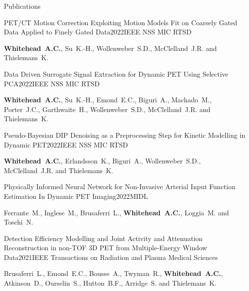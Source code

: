 \documentclass{cv}
\begin{document}
\begin{rSection}{Publications}
        \item \begin{rSubsection}{PET/CT Motion Correction Exploiting Motion Models Fit on Coarsely Gated Data Applied to Finely Gated Data}{2022}{IEEE NSS MIC RTSD}{}
            \item {\bf Whitehead~A.C.}, Su~K.-H., Wollenweber~S.D., McClelland~J.R. and Thielemans~K.
        \end{rSubsection}
        
        \item \begin{rSubsection}{Data Driven Surrogate Signal Extraction for Dynamic PET Using Selective PCA}{2022}{IEEE NSS MIC RTSD}{}
            \item {\bf Whitehead~A.C.}, Su~K.-H., Emond~E.C., Biguri~A., Machado~M., Porter~J.C., Garthwaite~H., Wollenweber~S.D., McClelland~J.R. and Thielemans~K.
        \end{rSubsection}
        
        \item \begin{rSubsection}{Pseudo-Bayesian DIP Denoising as a Preprocessing Step for Kinetic Modelling in Dynamic \newline PET}{2022}{IEEE NSS MIC RTSD}{}
            \item {\bf Whitehead~A.C.}, Erlandsson~K., Biguri~A., Wollenweber~S.D., McClelland~J.R. and Thielemans~K.
        \end{rSubsection}
        
        \item \begin{rSubsection}{Physically Informed Neural Network for Non-Invasive Arterial Input Function Estimation In Dynamic PET Imaging}{2022}{MIDL}{}
            \item Ferrante~M., Inglese~M., Brusaferri~L., {\bf Whitehead~A.C.}, Loggia~M. and Toschi~N.
        \end{rSubsection}
        
        \item \begin{rSubsection}{Detection Efficiency Modelling and Joint Activity and Attenuation Reconstruction in non-TOF 3D PET from Multiple-Energy Window Data}{2021}{IEEE Transactions on Radiation and Plasma Medical Sciences}{}
            \item Brusaferri~L., Emond~E.C., Bousse~A., Twyman~R., {\bf Whitehead~A.C.}, Atkinson~D., Ourselin~S., Hutton~B.F., Arridge~S. and Thielemans~K.
        \end{rSubsection}
        

\end{rSection}
\end{document}
